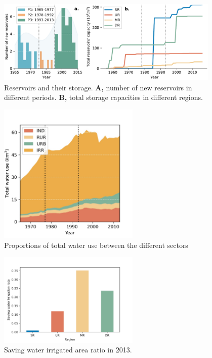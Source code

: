 \documentclass[9pt,twoside,lineno]{pnas-new}
\begin{document}
\begin{figure}
    \centering
    \includegraphics[width=0.95\textwidth]{../../figures/sup/reservoirs.pdf}
    \caption{
        Reservoirs and their storage.
        \textbf{A,} number of new reservoirs in different periods.
        \textbf{B,} total storage capacities in different regions. 
    }
\end{figure}

\begin{figure}
    \centering
    \includegraphics[width=0.6\textwidth]{../../figures/sup/sf_wu_sections_stackplot.jpg}
    \caption{Proportions of total water use between the different sectors}
\end{figure}


\begin{figure}
    \centering
    \includegraphics[width=0.6\textwidth]{../../figures/sup/saving_water.jpg}
    \caption{
        Saving water irrigated area ratio in 2013.
    }
\end{figure}
\end{document}
